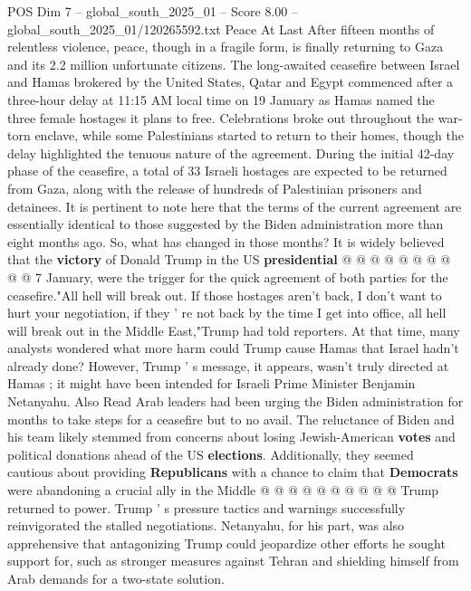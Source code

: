 \begin{textsample}{POS Dim 7 – global\_south\_2025\_01 – Score 8.00 – global\_south\_2025\_01/120265592.txt}  \label{ex:f7_pos_338}
Peace At Last After fifteen months of relentless violence, peace, though in a fragile form, is finally returning to Gaza and its 2.2 million unfortunate citizens.
The long-awaited ceasefire between Israel and Hamas brokered by the United States, Qatar and Egypt commenced after a three-hour delay at 11:15 AM local time on 19 January as Hamas named the three female hostages it plans to free.
Celebrations broke out throughout the war-torn enclave, while some Palestinians started to return to their homes, though the delay highlighted the tenuous nature of the agreement.
During the initial 42-day phase of the ceasefire, a total of 33 Israeli hostages are expected to be returned from Gaza, along with the release of hundreds of Palestinian prisoners and detainees.
It is pertinent to note here that the terms of the current agreement are essentially identical to those suggested by the Biden administration more than eight months ago.
So, what has changed in those months?
It is widely believed that the \textbf{victory} of Donald Trump in the US \textbf{presidential} @ @ @ @ @ @ @ @ @ @ 7 January, were the trigger for the quick agreement of both parties for the ceasefire."All hell will break out.
If those hostages aren't back, I don't want to hurt your negotiation, if they ' re not back by the time I get into office, all hell will break out in the Middle East,"Trump had told reporters.
At that time, many analysts wondered what more harm could Trump cause Hamas that Israel hadn't already done?
However, Trump ' s message, it appears, wasn't truly directed at Hamas ; it might have been intended for Israeli Prime Minister Benjamin Netanyahu.
Also Read Arab leaders had been urging the Biden administration for months to take steps for a ceasefire but to no avail.
The reluctance of Biden and his team likely stemmed from concerns about losing Jewish-American \textbf{votes} and political donations ahead of the US \textbf{elections}.
Additionally, they seemed cautious about providing \textbf{Republicans} with a chance to claim that \textbf{Democrats} were abandoning a crucial ally in the Middle @ @ @ @ @ @ @ @ @ @ Trump returned to power.
Trump ' s pressure tactics and warnings successfully reinvigorated the stalled negotiations.
Netanyahu, for his part, was also apprehensive that antagonizing Trump could jeopardize other efforts he sought support for, such as stronger measures against Tehran and shielding himself from Arab demands for a two-state solution.

\end{textsample}
